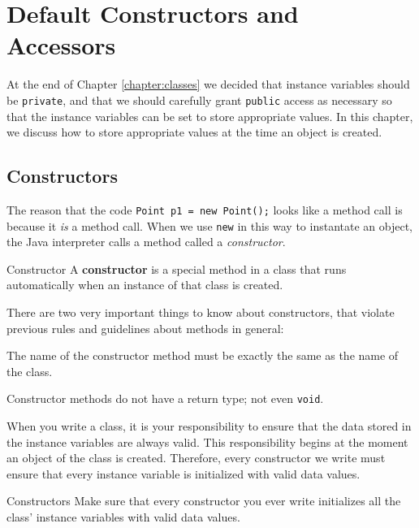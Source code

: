 
\chapter{Default Constructors and Accessors}
\label{chapter:default-constructors}

\minitoc

At the end of Chapter \ref{chapter:classes} we decided that instance variables should be \texttt{private}, and that we should carefully grant \texttt{public} access as necessary so that the instance variables can be set to store appropriate values.  In this chapter, we discuss how to store appropriate values at the time an object is created.

\section{Constructors}

The reason that the code \texttt{Point p1 = new Point();} looks like a method call is because it \textit{is} a method call.  When we use \texttt{new} in this way to instantate an object, the Java interpreter calls a method called a \textit{constructor}.

\begin{defn}{Constructor}
    A \textbf{constructor} is a special method in a class that runs automatically when an instance of that class is created.
\end{defn}

There are two very important things to know about constructors, that violate previous rules and guidelines about methods in general:
\bi
\item The name of the constructor method must be exactly the same as the name of the class.
\item Constructor methods do not have a return type; not even \texttt{void}.
\ei

When you write a class, it is your responsibility to ensure that the data stored in the instance variables are always valid.  This responsibility begins at the moment an object of the class is created.  Therefore, every constructor we write must ensure that every instance variable is initialized with valid data values.

\begin{tip}{Constructors}
    Make sure that every constructor you ever write initializes all the class' instance variables with valid data values.
\end{tip}


